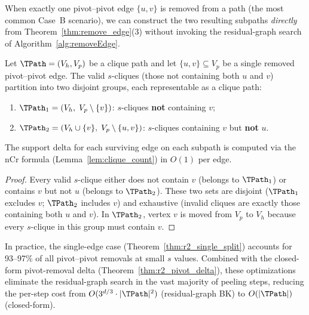 When exactly one pivot--pivot edge $\{u,v\}$ is removed from a path (the most common Case~B scenario), we can construct the two resulting subpaths \emph{directly} from Theorem~\ref{thm:remove_edge}(3) without invoking the residual-graph search of Algorithm~\ref{alg:removeEdge}.

\begin{theorem}\label{thm:r2_single_split}
Let $\TPath = (V_h, V_p)$ be a clique path and let $\{u, v\} \subseteq V_p$ be a single removed pivot--pivot edge.
The valid $s$-cliques (those not containing both $u$ and $v$) partition into two disjoint groups, each representable as a clique path:
\begin{enumerate}[leftmargin=*]
\item $\TPath_1 = (V_h,\; V_p \setminus \{v\})$: \quad $s$-cliques \textbf{not} containing $v$;
\item $\TPath_2 = (V_h \cup \{v\},\; V_p \setminus \{u, v\})$: \quad $s$-cliques containing $v$ but \textbf{not} $u$.
\end{enumerate}
The support delta for each surviving edge on each subpath is computed via the nCr formula (Lemma~\ref{lem:clique_count}) in $O(1)$ per edge.
\end{theorem}

\begin{proof}
Every valid $s$-clique either does not contain $v$ (belongs to $\TPath_1$)
or contains $v$ but not $u$ (belongs to $\TPath_2$).
These two sets are disjoint ($\TPath_1$ excludes $v$; $\TPath_2$ includes $v$)
and exhaustive (invalid cliques are exactly those containing both $u$ and $v$).
In $\TPath_2$, vertex $v$ is moved from $V_p$ to $V_h$ because every $s$-clique in this group must contain $v$.
\end{proof}

In practice, the single-edge case (Theorem~\ref{thm:r2_single_split}) accounts for 93--97\% of all pivot--pivot removals at small $s$ values.
Combined with the closed-form pivot-removal delta (Theorem~\ref{thm:r2_pivot_delta}),
these optimizations eliminate the residual-graph search in the vast majority of peeling steps,
reducing the per-step cost from $O(3^{d/3} \cdot |\TPath|^2)$ (residual-graph BK) to $O(|\TPath|)$ (closed-form).

